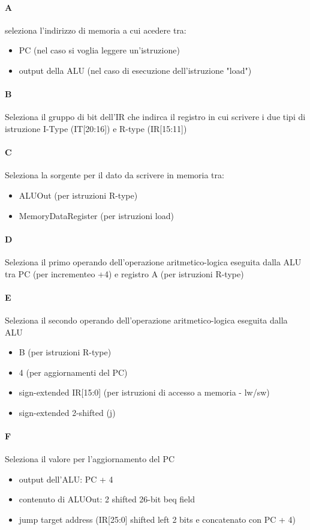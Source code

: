 \documentclass[12pt, a4paper, openany]{book}
\begin{document}
\paragraph*{A} seleziona l'indirizzo di memoria a cui acedere tra:
\begin{itemize}
    \item PC (nel caso si voglia leggere un'istruzione)
    \item output della ALU (nel caso di esecuzione dell'istruzione "load")
\end{itemize}
\paragraph*{B} Seleziona il gruppo di bit dell'IR che indirca il registro in cui scrivere
i due tipi di istruzione I-Type (IT[20:16]) e R-type (IR[15:11])
\paragraph*{C}Seleziona la sorgente per il dato da scrivere in memoria tra:
\begin{itemize}
    \item ALUOut (per istruzioni R-type)
    \item MemoryDataRegister (per istruzioni load)
\end{itemize}
\paragraph*{D} Seleziona il primo operando dell'operazione aritmetico-logica eseguita
dalla ALU tra PC (per incrementeo +4) e registro A (per istruzioni R-type)
\paragraph*{E} Seleziona il secondo operando dell'operazione aritmetico-logica eseguita
dalla ALU
\begin{itemize}
    \item B (per istruzioni R-type)
    \item 4 (per aggiornamenti del PC)
    \item sign-extended IR[15:0] (per istruzioni di accesso a memoria - lw/sw)
    \item sign-extended 2-shifted (j)
\end{itemize}
\paragraph*{F} Seleziona il valore per l'aggiornamento del PC
\begin{itemize}
    \item output dell'ALU: PC + 4
    \item contenuto di ALUOut: 2 shifted 26-bit beq field
    \item jump target address (IR[25:0] shifted left 2 bits e concatenato con PC + 4)
\end{itemize}
\end{document}
